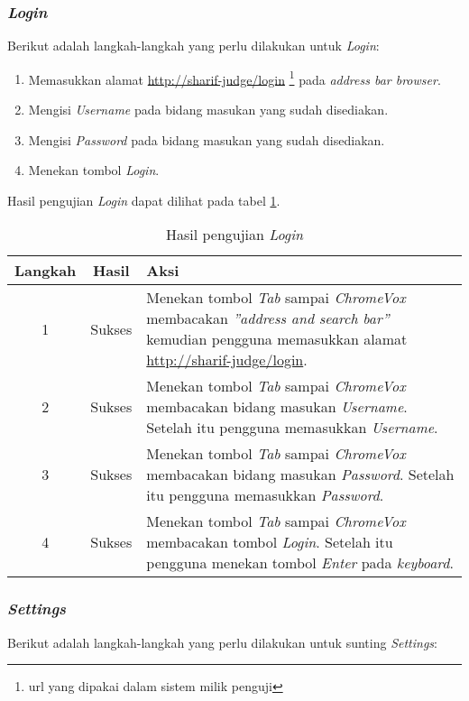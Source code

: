 \subsubsection{\textit{Login}}
\label{subsubsec:skenario_login}
Berikut adalah langkah-langkah yang perlu dilakukan untuk \textit{Login}:

\begin{enumerate}
	\item Memasukkan alamat \url{http://sharif-judge/login} \footnote{url yang dipakai dalam sistem milik penguji} pada \textit{address bar browser}.
	\item Mengisi \textit{Username} pada bidang masukan yang sudah disediakan.
	\item Mengisi \textit{Password} pada bidang masukan yang sudah disediakan.
	\item Menekan tombol \textit{Login}.
\end{enumerate}

Hasil pengujian \textit{Login} dapat dilihat pada tabel \ref{tab:hasil_login}.

\begin{table}[H]
	\centering
	\caption{Hasil pengujian \textit{Login}}
	\label{tab:hasil_login}
	\begin{tabular}{|c|c|p{12cm}|}
		\toprule
		Langkah & Hasil & Aksi\\
		\midrule
		1 & Sukses & Menekan tombol \textit{Tab} sampai \textit{ChromeVox} membacakan \textit{''address and search bar''} kemudian pengguna memasukkan alamat \url{http://sharif-judge/login}.\\
		2 & Sukses & Menekan tombol \textit{Tab} sampai \textit{ChromeVox} membacakan bidang masukan \textit{Username}. Setelah itu pengguna memasukkan \textit{Username}.\\
		3 & Sukses & Menekan tombol \textit{Tab} sampai \textit{ChromeVox} membacakan bidang masukan \textit{Password}. Setelah itu pengguna memasukkan \textit{Password}. \\
		4 & Sukses & Menekan tombol \textit{Tab} sampai \textit{ChromeVox} membacakan tombol \textit{Login}. Setelah itu pengguna menekan tombol \textit{Enter} pada \textit{keyboard}.\\
		\bottomrule
	\end{tabular}
\end{table}

\subsubsection{\textit{Settings}}
\label{subsubsec:skenario_settings}
Berikut adalah langkah-langkah yang perlu dilakukan untuk sunting \textit{Settings}:

